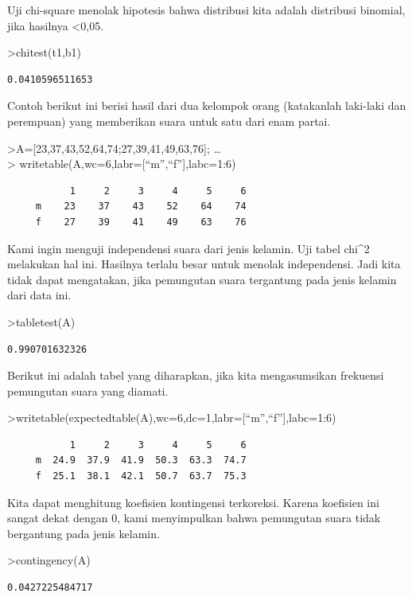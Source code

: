 \documentclass[
]{book}
\begin{document}
Uji chi-square menolak hipotesis bahwa distribusi kita adalah distribusi binomial, jika hasilnya \textless0,05.

\textgreater chitest(t1,b1)

\begin{verbatim}
0.0410596511653
\end{verbatim}

Contoh berikut ini berisi hasil dari dua kelompok orang (katakanlah laki-laki dan perempuan) yang memberikan suara untuk satu dari enam partai.

\textgreater A={[}23,37,43,52,64,74;27,39,41,49,63,76{]}; \ldots{}\\
\textgreater{} writetable(A,wc=6,labr={[}``m'',``f''{]},labc=1:6)

\begin{verbatim}
           1     2     3     4     5     6
     m    23    37    43    52    64    74
     f    27    39    41    49    63    76
\end{verbatim}

Kami ingin menguji independensi suara dari jenis kelamin. Uji tabel chi\^{}2 melakukan hal ini. Hasilnya terlalu besar untuk menolak independensi. Jadi kita tidak dapat mengatakan, jika pemungutan suara tergantung pada jenis kelamin dari data ini.

\textgreater tabletest(A)

\begin{verbatim}
0.990701632326
\end{verbatim}

Berikut ini adalah tabel yang diharapkan, jika kita mengasumsikan frekuensi pemungutan suara yang diamati.

\textgreater writetable(expectedtable(A),wc=6,dc=1,labr={[}``m'',``f''{]},labc=1:6)

\begin{verbatim}
           1     2     3     4     5     6
     m  24.9  37.9  41.9  50.3  63.3  74.7
     f  25.1  38.1  42.1  50.7  63.7  75.3
\end{verbatim}

Kita dapat menghitung koefisien kontingensi terkoreksi. Karena koefisien ini sangat dekat dengan 0, kami menyimpulkan bahwa pemungutan suara tidak bergantung pada jenis kelamin.

\textgreater contingency(A)

\begin{verbatim}
0.0427225484717
\end{verbatim}
\end{document}
